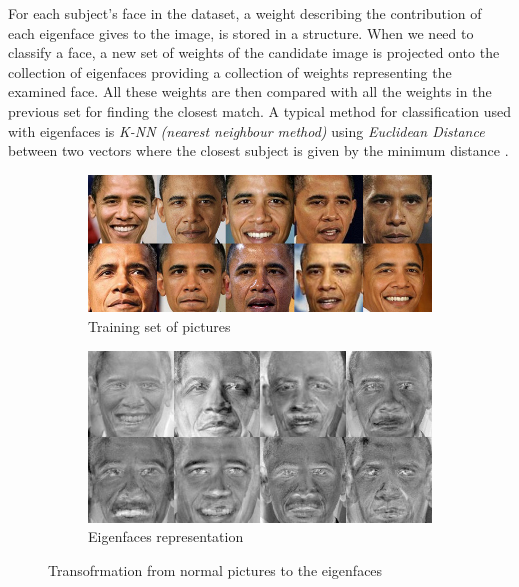 \documentclass{report}
\begin{document}
For each subject's face in the dataset, a weight describing the contribution of each eigenface gives to the image, is stored in a structure.
When we need to classify a face, a new set of weights of the candidate image is projected onto the collection of eigenfaces providing a collection of weights representing the examined face. All these weights are then compared with all the weights in the previous set for finding the closest match. A typical method for classification used with eigenfaces is \textit{K-NN (nearest neighbour method)} using \textit{Euclidean Distance} between two vectors where the closest subject is given by the minimum distance \cite{turk1991face}.

\begin{figure}[!htb]
  \centering
  \begin{subfigure}{.5\textwidth}
    \centering
    \includegraphics[scale=0.35]{images/obama_normal.png}
    \caption{Training set of pictures}
  \end{subfigure}%
  \begin{subfigure}{.5\textwidth}
    \centering
    \includegraphics[scale=0.35]{images/obama_eigenface.png}
    \caption{Eigenfaces representation}
  \end{subfigure}
  \caption{Transofrmation from normal pictures to the eigenfaces}
  \label{fig:eigenfaces}
\end{figure}
\end{document}
